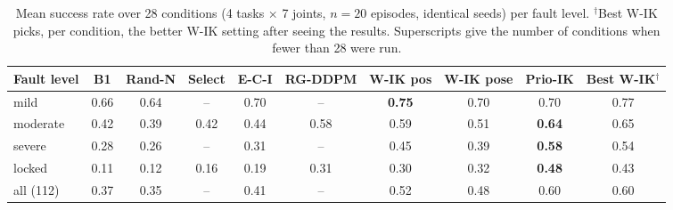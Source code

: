 \begin{table}[t]
\centering
\caption{Mean success rate over 28 conditions (4 tasks $\times$ 7 joints, $n{=}20$ episodes, identical seeds) per fault level. $^\dagger$Best W-IK picks, per condition, the better W-IK setting after seeing the results. Superscripts give the number of conditions when fewer than 28 were run.}
\label{tab:main}
\setlength{\tabcolsep}{3pt}
\begin{tabular}{lccccccccc}
\toprule
Fault level & B1 & Rand-N & Select & E-C-I & RG-DDPM & W-IK pos & W-IK pose & \textbf{Prio-IK} & Best W-IK$^\dagger$ \\
\midrule
mild & 0.66 & 0.64 & -- & 0.70 & -- & \textbf{0.75} & 0.70 & 0.70 & 0.77 \\
moderate & 0.42 & 0.39 & 0.42 & 0.44 & 0.58 & 0.59 & 0.51 & \textbf{0.64} & 0.65 \\
severe & 0.28 & 0.26 & -- & 0.31 & -- & 0.45 & 0.39 & \textbf{0.58} & 0.54 \\
locked & 0.11 & 0.12 & 0.16 & 0.19 & 0.31 & 0.30 & 0.32 & \textbf{0.48} & 0.43 \\
all (112) & 0.37 & 0.35 & -- & 0.41 & -- & 0.52 & 0.48 & 0.60 & 0.60 \\
\bottomrule
\end{tabular}
\end{table}
